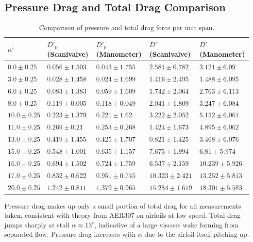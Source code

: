 \documentclass[runningheads]{llncs}
\begin{document}
\subsection{Pressure Drag and Total Drag Comparison}

\begin{table}[h]
\centering
\begin{tabular}{p{3cm}p{3cm}p{3cm}p{3cm}p{3cm}}
\toprule
$\alpha^\circ$ & $D'_p$ (Scanivalve) & $D'_p$ (Manometer) & $D'$ (Scanivalve) & $D'$ (Manometer) \\
\midrule
 $0.0\pm0.25$ &     $0.056\pm1.503$ &    $0.043\pm1.755$ &   $2.584\pm0.782$ &   $3.121\pm6.09$ \\
 $3.0\pm0.25$ &     $0.028\pm1.458$ &    $0.024\pm1.699$ &   $1.416\pm2.495$ &  $1.488\pm6.095$ \\
 $6.0\pm0.25$ &     $0.083\pm1.383$ &    $0.059\pm1.609$ &   $1.742\pm2.064$ &  $2.763\pm6.113$ \\
 $8.0\pm0.25$ &     $0.119\pm0.005$ &    $0.118\pm0.049$ &   $2.041\pm1.809$ &  $3.247\pm6.084$ \\
$10.0\pm0.25$ &     $0.223\pm1.379$ &     $0.221\pm1.62$ &   $3.222\pm2.052$ &  $5.152\pm6.061$ \\
$11.0\pm0.25$ &      $0.269\pm0.21$ &    $0.253\pm0.268$ &   $1.424\pm1.673$ &  $4.895\pm6.062$ \\
$13.0\pm0.25$ &     $0.419\pm1.455$ &    $0.425\pm1.707$ &   $0.821\pm1.425$ &  $3.468\pm6.076$ \\
$15.0\pm0.25$ &     $0.548\pm1.001$ &    $0.635\pm1.157$ &   $7.675\pm1.994$ &   $6.81\pm5.974$ \\
$16.0\pm0.25$ &     $0.694\pm1.502$ &    $0.724\pm1.759$ &   $6.537\pm2.159$ & $10.239\pm5.926$ \\
$17.0\pm0.25$ &     $0.832\pm0.622$ &    $0.951\pm0.745$ &  $10.323\pm2.421$ & $13.252\pm5.813$ \\
$20.0\pm0.25$ &     $1.242\pm0.811$ &    $1.379\pm0.965$ &  $15.284\pm1.619$ & $18.301\pm5.583$ \\
\bottomrule
\end{tabular}
\caption{Comparison of pressure and total drag force per unit span.}
\label{tab:pressure_comparison}
\end{table}

Pressure drag makes up only a small portion of total drag for all measurements taken, consistent with theory from AER307 on airfoils at low speed. Total drag jumps sharply at stall $\alpha \approx 13^\circ$, indicative of a large viscous wake forming from separated flow. Pressure drag increases with $\alpha$ due to the airfoil itself pitching up. 
\end{document}
